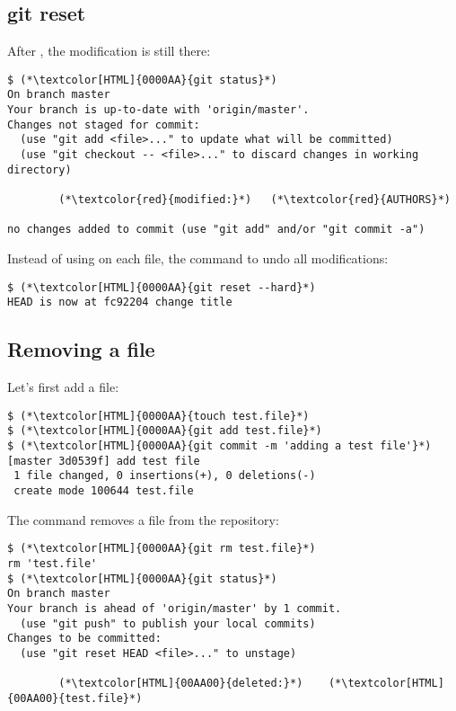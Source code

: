 \subsection{git reset}
\begin{frame}[fragile]
\subslidetitle
  After , the modification is still there:
\begin{lstlisting}
$ (*\textcolor[HTML]{0000AA}{git status}*)
On branch master
Your branch is up-to-date with 'origin/master'.
Changes not staged for commit:
  (use "git add <file>..." to update what will be committed)
  (use "git checkout -- <file>..." to discard changes in working directory)

        (*\textcolor{red}{modified:}*)   (*\textcolor{red}{AUTHORS}*)

no changes added to commit (use "git add" and/or "git commit -a")
\end{lstlisting}

  Instead of using  on each file, the command  to undo all modifications:
\begin{lstlisting}
$ (*\textcolor[HTML]{0000AA}{git reset --hard}*)
HEAD is now at fc92204 change title
\end{lstlisting}
\end{frame}

\subsection{Removing a file}
\begin{frame}[fragile]
\subslidetitle
  Let's first add a file:
\begin{lstlisting}
$ (*\textcolor[HTML]{0000AA}{touch test.file}*)
$ (*\textcolor[HTML]{0000AA}{git add test.file}*)
$ (*\textcolor[HTML]{0000AA}{git commit -m 'adding a test file'}*)
[master 3d0539f] add test file
 1 file changed, 0 insertions(+), 0 deletions(-)
 create mode 100644 test.file
\end{lstlisting}

  The command  removes a file from the repository:
\begin{lstlisting}
$ (*\textcolor[HTML]{0000AA}{git rm test.file}*)
rm 'test.file'
$ (*\textcolor[HTML]{0000AA}{git status}*)
On branch master
Your branch is ahead of 'origin/master' by 1 commit.
  (use "git push" to publish your local commits)
Changes to be committed:
  (use "git reset HEAD <file>..." to unstage)

        (*\textcolor[HTML]{00AA00}{deleted:}*)    (*\textcolor[HTML]{00AA00}{test.file}*)
\end{lstlisting}
\end{frame}

